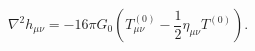 \begin{equation}
  \label{linear1}
  \nabla^2h_{\mu\nu}=-16\pi G_0(T^{(0)}_{\mu\nu}-\frac{1}{2}\eta_{\mu\nu}T^{(0)}).
  \end{equation}

